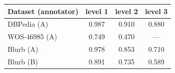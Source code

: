 \begin{tabular}{lccc}
\toprule
Dataset (annotator) & level 1 & level 2 & level 3 \\
\midrule
DBPedia (A) & 0.987 & 0.910 & 0.880 \\
WOS-46985 (A) & 0.749 & 0.470 & --- \\
Blurb (A) & 0.978 & 0.853 & 0.710 \\
Blurb (B) & 0.891 & 0.735 & 0.589 \\
\bottomrule
\end{tabular}
